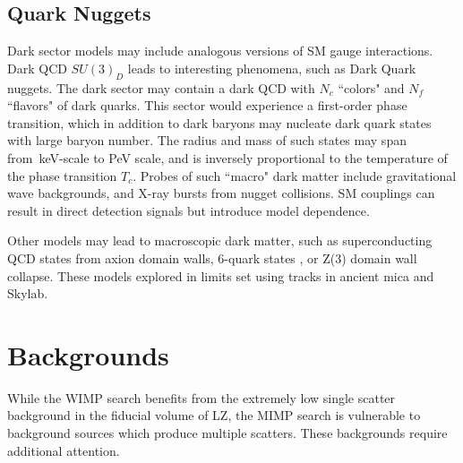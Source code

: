 \subsection{Quark Nuggets}
\label{sec:nuggets}

Dark sector models may include analogous versions of SM gauge interactions.
Dark QCD $SU(3)_D$ leads to interesting phenomena, such as Dark Quark nuggets\cite{bai_dark_2019,witten_cosmic_1984}.
The dark sector may contain a dark QCD with $N_c$ ``colors" and $N_f$ ``flavors" of dark quarks.
This sector would experience a first-order phase transition, which in addition to dark baryons may nucleate dark quark states with large baryon number.
The radius and mass of such states may span from~keV-scale to PeV scale, and is inversely proportional to the temperature of the phase transition $T_c$.
Probes of such ``macro" dark matter include gravitational wave backgrounds, and X-ray bursts from nugget collisions\cite{bai_dark_2019}.
SM couplings can result in direct detection signals but introduce model dependence.


Other models may lead to macroscopic dark matter, such as superconducting QCD states from axion domain walls\cite{zhitnitsky_nonbaryonic_2003}, 6-quark states \cite{bai_six_2018}, or Z(3) domain wall collapse\cite{atreya_reviving_2014}.
These models explored in limits set using tracks in ancient mica and Skylab\cite{jacobs_macro_2015}.



\section{Backgrounds}

While the WIMP search benefits from the extremely low single scatter background in the fiducial volume of LZ, the MIMP search is vulnerable to background sources which produce multiple scatters.
These backgrounds require additional attention.

